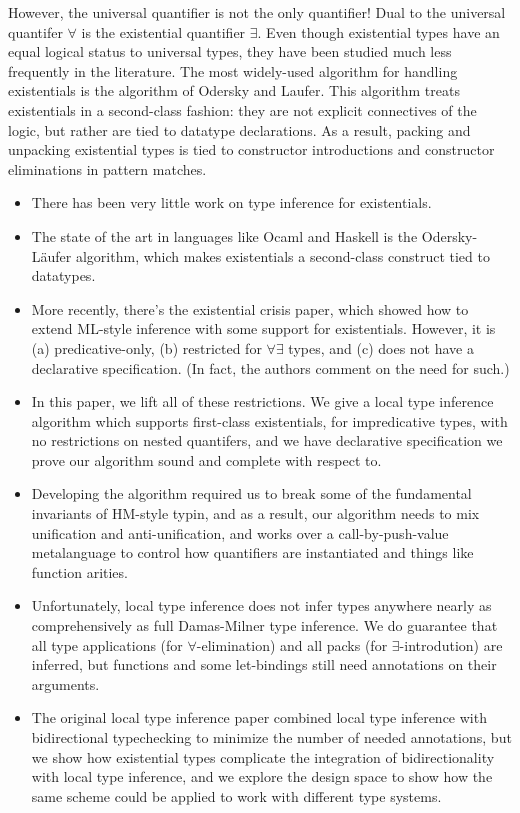 However, the universal quantifier is not the only quantifier! Dual to the universal quantifer $\forall$ is the existential quantifier $\exists$. Even though existential types have an equal logical status to universal types, they have been studied much less frequently in the literature. The most widely-used algorithm for handling existentials is the algorithm of Odersky and Laufer. This algorithm treats existentials in a second-class fashion: they are not explicit connectives of the logic, but rather are tied to datatype declarations. As a result, packing and unpacking existential types is tied to constructor introductions and constructor eliminations in pattern matches. 

\begin{itemize}
\item There has been very little work on type inference for existentials. 
\item The state of the art in languages like Ocaml and Haskell is the
  Odersky-L\"{a}ufer algorithm, which makes existentials a
  second-class construct tied to datatypes.
\item More recently, there's the existential crisis paper, which
  showed how to extend ML-style inference with some support for
  existentials. However, it is (a) predicative-only, (b) restricted
  for $\forall\exists$ types, and (c) does not have a declarative
  specification. (In fact, the authors comment on the need for such.)
\item In this paper, we lift all of these restrictions. We give a
  local type inference algorithm which supports first-class
  existentials, for impredicative types, with no restrictions on
  nested quantifers, and we have declarative specification we prove
  our algorithm sound and complete with respect to.
\item Developing the algorithm required us to break some of the
  fundamental invariants of HM-style typin, and as a result, our
  algorithm needs to mix unification and anti-unification, and works
  over a call-by-push-value metalanguage to control how quantifiers
  are instantiated and things like function arities.
\item Unfortunately, local type inference does not infer types anywhere
  nearly as comprehensively as full Damas-Milner type inference. We
  do guarantee that all type applications (for $\forall$-elimination) 
  and all packs (for $\exists$-introdution) are inferred, but functions
  and some let-bindings still need annotations on their arguments.
\item The original local type inference paper combined local type inference
  with bidirectional typechecking to minimize the number of needed
  annotations, but we show how existential types complicate the integration
  of bidirectionality with local type inference, and we explore the design space
  to show how the same scheme could be applied to work with different
  type systems. 
\end{itemize}





